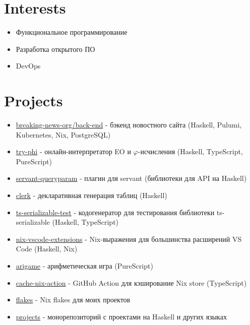 \documentclass[twocolumn,11pt]{report}
\begin{document}
\section*{Interests}
\begin{itemize}
     \itemsep0em
     \item Функциональное программирование
     \item Разработка открытого ПО
     \item DevOps
\end{itemize}

\section*{Projects}
\begin{itemize}
     \item \href{https://github.com/breaking-news-org/back-end#readme}{breaking-news-org/back-end} - бэкенд новостного сайта (Haskell, Pulumi, Kubernetes, Nix, PostgreSQL)
     \item \href{https://github.com/objectionary/try-phi#readme}{try-phi} - онлайн-интерпретатор EO и $\varphi$-исчисления (Haskell, TypeScript, PureScript)
     \item \href{https://github.com/deemp/servant-queryparam#readme}{servant-queryparam} - плагин для servant (библиотеки для API на Haskell)
     \item \href{https://github.com/deemp/clerk#readme}{clerk} - декларативная генерация таблиц (Haskell)
     \item \href{https://github.com/deemp/projects/tree/main/haskell/ts-serializable-test#readme}{ts-serializable-test} - кодогенератор для тестирования библиотеки ts-serializable (Haskell, TypeScript)
     \item \href{https://github.com/nix-community/nix-vscode-extensions#readme}{nix-vscode-extensions} - Nix-выражения для большинства расширений VS Code (Haskell, Nix)
     \item \href{https://github.com/deemp/arigame#readme}{arigame} - арифметическая игра (PureScript)
     \item \href{https://github.com/nix-community/cache-nix-action#readme}{cache-nix-action} - GitHub Action для кэширование Nix store (TypeScript)
     \item \href{https://github.com/deemp/flakes#readme}{flakes} - Nix flakes для моих проектов
     \item \href{https://github.com/deemp/projects#readme}{projects} - монорепозиторий с проектами на Haskell и других языках
\end{itemize}
\end{document}
